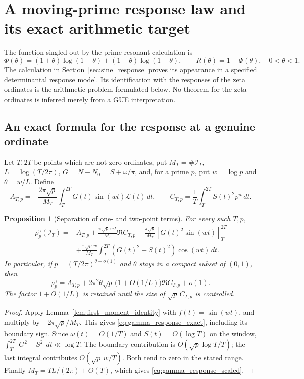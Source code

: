 \documentclass[11pt,reqno]{amsart}
\theoremstyle{plain}\newtheorem{theorem}{Theorem}[section]\newtheorem{proposition}[theorem]{Proposition}\newtheorem{lemma}[theorem]{Lemma}\newtheorem{corollary}[theorem]{Corollary}
\theoremstyle{definition}\newtheorem{hypothesis}[theorem]{Hypothesis}\newtheorem{definition}[theorem]{Definition}
\theoremstyle{remark}\newtheorem{remark}[theorem]{Remark}\newtheorem{experiment}[theorem]{Experiment}\newtheorem{question}[theorem]{Question}\newtheorem{heuristic}[theorem]{Heuristic}\newtheorem{conjecture}[theorem]{Conjecture}
\newcommand{\NO}{N_0}\newcommand{\lL}{\mathcal L}\newcommand{\IT}{\mathcal I_T}\newcommand{\R}{\mathbb R}\newcommand{\N}{\mathbb N}\newcommand{\eps}{\varepsilon}\newcommand{\sgn}{\operatorname{sgn}}
\begin{document}
\section{A moving-prime response law and its exact arithmetic target}
\label{sec:moving_response}
The function singled out by the prime-resonant calculation is
\begin{equation}
 \Phi(\theta)=(1+\theta)\log(1+\theta)+(1-\theta)\log(1-\theta),
 \qquad R(\theta)=1-\Phi(\theta),\quad 0<\theta<1.
 \label{eq:universal_candidate}
\end{equation}
The calculation in Section~\ref{sec:sine_response} proves its appearance in a specified determinantal response model. Its identification with the responses of the zeta ordinates is the arithmetic problem formulated below. No theorem for the zeta ordinates is inferred merely from a GUE interpretation.

\subsection{An exact formula for the response at a genuine ordinate}
\label{subsec:gamma_response_identity}
Let $T,2T$ be points which are not zero ordinates, put $M_T=\#\IT$, $L=\log(T/2\pi)$, $G=N-\NO=S+\omega/\pi$, and, for a prime $p$, put $w=\log p$ and $\theta=w/L$. Define
\begin{equation}
 A_{T,p}=-\frac{2\pi\sqrt p}{M_T}\int_T^{2T}G(t)\sin(wt)\lL(t)\,dt,
 \qquad C_{T,p}=\frac1T\int_T^{2T}S(t)^2p^{it}\,dt.
 \label{eq:ATp_CTp}
\end{equation}
\begin{proposition}[Separation of one- and two-point terms]\label{prop:gamma_response_exact}
For every such $T,p$,
\begin{equation}
 \begin{split}
 \rho_p^\gamma(\IT)={}& A_{T,p}
 +\frac{\pi\sqrt p\,wT}{M_T}\Re C_{T,p}
 -\frac{\pi\sqrt p}{M_T}[G(t)^2\sin(wt)]_T^{2T}\\
 &+\frac{\pi\sqrt p\,w}{M_T}
       \int_T^{2T}(G(t)^2-S(t)^2)\cos(wt)\,dt.
 \end{split}
 \label{eq:gamma_response_exact}
\end{equation}
In particular, if $p=(T/2\pi)^{\theta+o(1)}$ and $\theta$ stays in a compact subset of $(0,1)$, then
\begin{equation}
 \rho_p^\gamma=A_{T,p}
 +2\pi^2\theta\sqrt p\,\bigl(1+O(1/L)\bigr)\Re C_{T,p}+o(1).
 \label{eq:gamma_response_scaled}
\end{equation}
The factor $1+O(1/L)$ is retained until the size of $\sqrt p\,C_{T,p}$ is controlled.
\end{proposition}
\begin{proof}
Apply Lemma~\ref{lem:first_moment_identity} with $f(t)=\sin(wt)$, and multiply by $-2\pi\sqrt p/M_T$. This gives \eqref{eq:gamma_response_exact}, including its boundary sign. Since $\omega(t)=O(1/T)$ and $S(t)=O(\log T)$ on the window, $\int_T^{2T}|G^2-S^2|\,dt\ll\log T$. The boundary contribution is $O(\sqrt p\log T/T)$; the last integral contributes $O(\sqrt p\,w/T)$. Both tend to zero in the stated range. Finally $M_T=TL/(2\pi)+O(T)$, which gives \eqref{eq:gamma_response_scaled}.
\end{proof}
\end{document}
